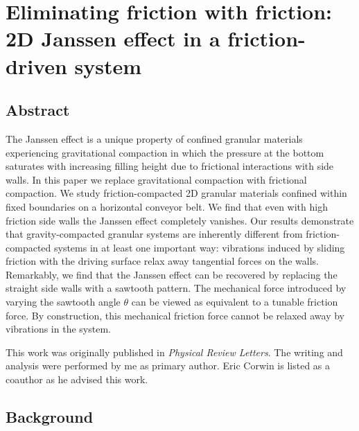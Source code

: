 \chapter{Eliminating friction with friction: 2D Janssen effect in a friction-driven system}
\author{Mohammad Yasinul Karim, Eric I. Corwin}


\section{Abstract}

The Janssen effect is a unique property of confined granular materials experiencing gravitational compaction in which the pressure at the bottom saturates with increasing filling height due to frictional interactions with side walls. In this paper we replace gravitational compaction with frictional compaction.  We study friction-compacted 2D granular materials confined within fixed boundaries on a horizontal conveyor belt. We find that even with high friction side walls the Janssen effect completely vanishes. Our results demonstrate that gravity-compacted granular systems are inherently different from friction-compacted systems in at least one important way: vibrations induced by sliding friction with the driving surface relax away tangential forces on the walls. Remarkably, we find that the Janssen effect can be recovered by replacing the straight side walls with a sawtooth pattern. The mechanical force introduced by varying the sawtooth angle $\theta$ can be viewed as equivalent to a tunable friction force. By construction, this mechanical friction force cannot be relaxed away by vibrations in the system.

This work was originally published in \textit{Physical Review Letters}.  The writing and analysis were performed by me as primary author.  Eric Corwin is listed as a coauthor as he advised this work.  

\section{Background}

